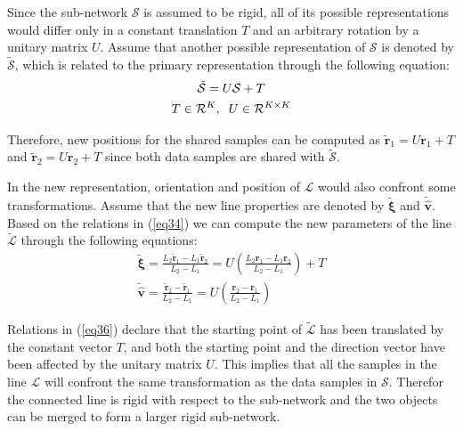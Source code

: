 \documentclass[10pt,journal,cspaper,compsoc]{IEEEtran}
\begin{document}
Since the sub-network $\mathcal{S}$ is assumed to be rigid, all of its possible representations would differ only in a constant translation $T$ and an arbitrary rotation by a unitary matrix $U$. Assume that another possible representation of $\mathcal{S}$ is denoted by $\tilde{\mathcal{S}}$, which is related to the primary representation through the following equation:
\begin{gather}
\label{eq35}
\tilde{\mathcal{S}}=U\mathcal{S}+T \\
T\in \mathcal{R}^K, \hspace{2mm} U\in \mathcal{R}^{K\times K} \nonumber
\end{gather}

Therefore, new positions for the shared samples can be computed as $\tilde{\boldsymbol{r}}_1=U\boldsymbol{r}_1+T$ and $\tilde{\boldsymbol{r}}_2=U\boldsymbol{r}_2+T$ since both data samples are shared with $\tilde{\mathcal{S}}$.

In the new representation, orientation and position of $\mathcal{L}$ would also confront some transformations. Assume that the new line properties are denoted  by $\tilde{\boldsymbol{\xi}}$ and $\tilde{\hat{\boldsymbol{v}}}$. Based on the relations in (\ref{eq34}) we can compute the new parameters of the line $\tilde{\mathcal{L}}$ through the following equations:
\begin{gather}
\label{eq36}
\tilde{\boldsymbol{\xi}}=\frac{L_2\tilde{\boldsymbol{r}}_1-L_1\tilde{\boldsymbol{r}}_2}{L_2-L_1}=U\left(\frac{L_2\boldsymbol{r}_1-L_1\boldsymbol{r}_2}{L_2-L_1}\right)+T
\\
\tilde{\hat{\boldsymbol{v}}}=\frac{\tilde{\boldsymbol{r}}_2-\tilde{\boldsymbol{r}}_1}{L_2-L_1}=U\left(\frac{\boldsymbol{r}_2-\boldsymbol{r}_1}{L_2-L_1}\right) \nonumber
\end{gather}

Relations in (\ref{eq36}) declare that the starting point of $\tilde{\mathcal{L}}$ has been translated by the constant vector $T$, and both the starting point and the direction vector have been affected by the unitary matrix $U$. This implies that all the samples in the line $\mathcal{L}$ will confront the same transformation as the data samples in $\mathcal{S}$. Therefor the connected line is rigid with respect to the sub-network and the two objects can be merged to form a larger rigid sub-network.
\end{document}
